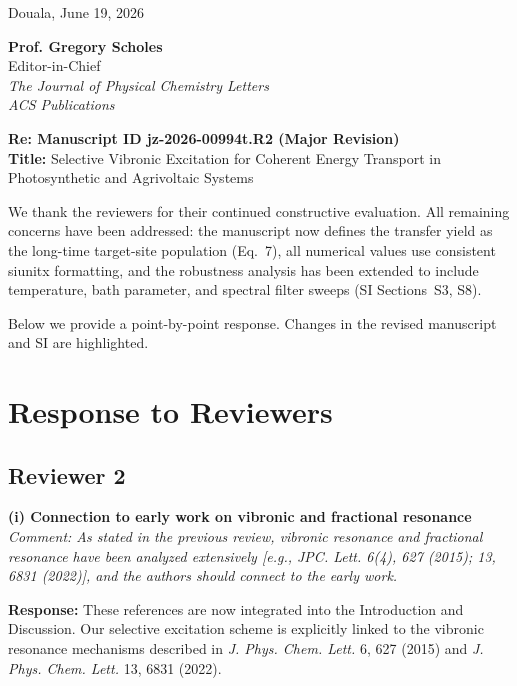 \documentclass[11pt]{article}
\begin{document}
\begin{flushright}
    Douala, June 19, 2026
\end{flushright}

\noindent \textbf{Prof. Gregory Scholes}\\
Editor-in-Chief\\
\textit{The Journal of Physical Chemistry Letters}\\
\textit{ACS Publications}

\vspace{1em}

\noindent \textbf{Re: Manuscript ID jz-2026-00994t.R2 (Major Revision)}\\
\textbf{Title:} Selective Vibronic Excitation for Coherent Energy Transport in Photosynthetic and Agrivoltaic Systems

\vspace{2em}

\noindent We thank the reviewers for their continued constructive evaluation. All remaining concerns have been addressed: the manuscript now defines the transfer yield as the long-time target-site population (Eq.~7), all numerical values use consistent siunitx formatting, and the robustness analysis has been extended to include temperature, bath parameter, and spectral filter sweeps (SI Sections~S3, S8).

Below we provide a point-by-point response. Changes in the revised manuscript and SI are highlighted.

\vspace{2em}

\section*{Response to Reviewers}

\subsection*{Reviewer 2}

\textbf{(i) Connection to early work on vibronic and fractional resonance}
\textit{Comment: As stated in the previous review, vibronic resonance and fractional resonance have been analyzed extensively [e.g., JPC. Lett. 6(4), 627 (2015); 13, 6831 (2022)], and the authors should connect to the early work.}

\textbf{Response:} These references are now integrated into the Introduction and Discussion. Our selective excitation scheme is explicitly linked to the vibronic resonance mechanisms described in \textit{J. Phys. Chem. Lett.} 6, 627 (2015) and \textit{J. Phys. Chem. Lett.} 13, 6831 (2022).
\end{document}
